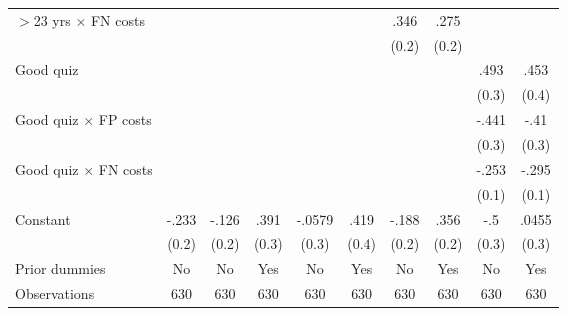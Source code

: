 \begin{table}[htbp]
\begin{tabular}{l*{9}{c}}
$>$23 yrs $\times$ FN costs&                  &                  &                  &                  &                  &     .346         &     .275         &                  &                  \\
                &                  &                  &                  &                  &                  &    (0.2)         &    (0.2)         &                  &                  \\
Good quiz       &                  &                  &                  &                  &                  &                  &                  &     .493         &     .453         \\
                &                  &                  &                  &                  &                  &                  &                  &    (0.3)         &    (0.4)         \\
Good quiz $\times$ FP costs&                  &                  &                  &                  &                  &                  &                  &    -.441\sym{*}  &     -.41         \\
                &                  &                  &                  &                  &                  &                  &                  &    (0.3)         &    (0.3)         \\
Good quiz $\times$ FN costs&                  &                  &                  &                  &                  &                  &                  &    -.253\sym{*}  &    -.295\sym{**} \\
                &                  &                  &                  &                  &                  &                  &                  &    (0.1)         &    (0.1)         \\
Constant        &    -.233         &    -.126         &     .391         &   -.0579         &     .419         &    -.188         &     .356         &      -.5\sym{**} &    .0455         \\
                &    (0.2)         &    (0.2)         &    (0.3)         &    (0.3)         &    (0.4)         &    (0.2)         &    (0.2)         &    (0.3)         &    (0.3)         \\
Prior dummies   &       No         &       No         &      Yes         &       No         &      Yes         &       No         &      Yes         &       No         &      Yes         \\
\hline
Observations    &      630         &      630         &      630         &      630         &      630         &      630         &      630         &      630         &      630         \\

\end{tabular}
\end{table}
